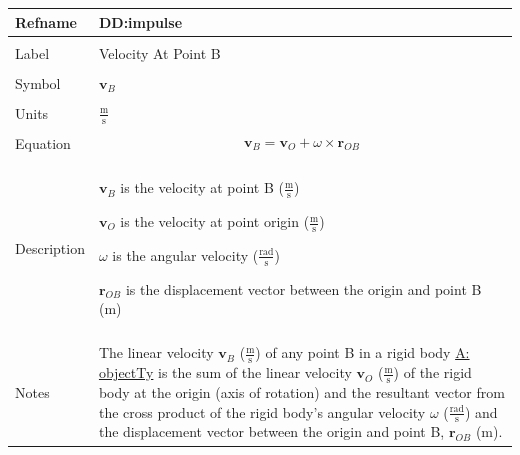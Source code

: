 \documentclass[12pt]{article}
\begin{document}
 \noindent \begin{minipage}{\textwidth}
\begin{tabular}{p{} p{}}
\toprule \textbf{Refname} & \textbf{DD:impulse}
\label{DD:impulse}
\\ \midrule \\
Label & Velocity At Point B
        \\ \midrule \\
        Symbol & ${\mathbf{v}_{B}}$
                 \\ \midrule \\
                 Units & $\frac{\text{m}}{\text{s}}$
                         \\ \midrule \\
                         Equation & \begin{displaymath}
                                    {\mathbf{v}_{B}}={\mathbf{v}_{O}}+ω\times{\mathbf{r}_{OB}}
                                    \end{displaymath}
                                    \\ \midrule \\
                                    Description & \begin{symbDescription}
                                                  \item{${\mathbf{v}_{B}}$ is the velocity at point B ($\frac{\text{m}}{\text{s}}$)}
                                                  \item{${\mathbf{v}_{O}}$ is the velocity at point origin ($\frac{\text{m}}{\text{s}}$)}
                                                  \item{$ω$ is the angular velocity ($\frac{\text{rad}}{\text{s}}$)}
                                                  \item{${\mathbf{r}_{OB}}$ is the displacement vector between the origin and point B (m)}
                                                  \end{symbDescription}
                                                  \\ \midrule \\
                                                  Notes & The linear velocity ${\mathbf{v}_{B}}$ ($\frac{\text{m}}{\text{s}}$) of any point B in a rigid body \hyperref[A:objectTy]{A: objectTy} is the sum of the linear velocity ${\mathbf{v}_{O}}$ ($\frac{\text{m}}{\text{s}}$) of the rigid body at the origin (axis of rotation) and the resultant vector from the cross product of the rigid body's angular velocity $ω$ ($\frac{\text{rad}}{\text{s}}$) and the displacement vector between the origin and point B, ${\mathbf{r}_{OB}}$ (m).

\end{tabular}
\end{minipage}
\end{document}
